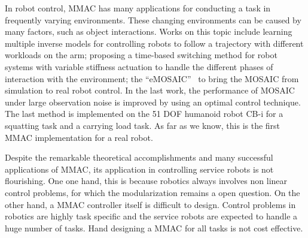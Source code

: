 In robot control, MMAC has many applications for conducting a task in frequently varying environments. These changing environments can be caused by many factors, such as object interactions. Works on this topic include \citet{petkos2006learning} learning multiple inverse models for controlling robots to follow a trajectory with different workloads on the arm; \citet{nakanishi2013spatio} proposing a time-based switching method for robot systems with variable stiffness actuation to handle the different phases of interaction with the environment; the ``eMOSAIC''~\citep{sugimoto2012emosaic} to bring the MOSAIC from simulation to real robot control. In the last work, the performance of MOSAIC under large observation noise is improved by using an optimal control technique. The last method is implemented on the 51 DOF humanoid robot CB-i for a squatting task and a carrying load task. As far as we know, this is the first MMAC implementation for a real robot.

Despite the remarkable theoretical accomplishments and many successful applications of MMAC, its application in controlling service robots is not flourishing. One one hand, this is because robotics always involves non linear control problems, for which the modularization remains a open question.
On the other hand, a MMAC controller itself is difficult to design. Control problems in robotics are highly task specific and the service robots are expected to handle a huge number of tasks. Hand designing a MMAC for all tasks is not cost effective. %


%
%

